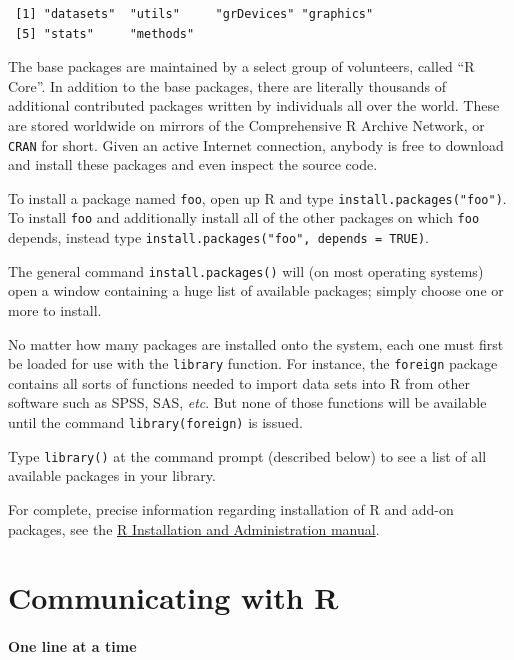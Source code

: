 \documentclass[captions=tableheading]{scrbook}
\begin{document}
\begin{verbatim}
 [1] "datasets"  "utils"     "grDevices" "graphics" 
 [5] "stats"     "methods"
\end{verbatim}

The base packages are maintained by a select group of volunteers, called ``\textsf{R} Core''. In addition to the base packages, there are literally thousands of additional contributed packages written by individuals all over the world. These are stored worldwide on mirrors of the Comprehensive \textsf{R} Archive Network, or \texttt{CRAN} for short. Given an active Internet connection, anybody is free to download and install these packages and even inspect the source code.

To install a package named \texttt{foo}, open up \textsf{R} and type \texttt{install.packages("foo")}. To install \texttt{foo} and additionally install all of the other packages on which \texttt{foo} depends, instead type \texttt{install.packages("foo", depends = TRUE)}.

The general command \texttt{install.packages()} will (on most operating systems) open a window containing a huge list of available packages; simply choose one or more to install.

No matter how many packages are installed onto the system, each one must first be loaded for use with the \texttt{library} function. For instance, the \texttt{foreign} package \cite{foreign} contains all sorts of functions needed to import data sets into \textsf{R} from other software such as SPSS, SAS, \emph{etc}. But none of those functions will be available until the command \texttt{library(foreign)} is issued. 

Type \texttt{library()} at the command prompt (described below) to see a list of all available
packages in your library.

For complete, precise information regarding installation of \textsf{R} and add-on packages, see the \href{http://cran.r-project.org/manuals.html}{\textsf{R} Installation and Administration manual}.
\section{Communicating with \textsf{R}}
\label{sec-2-2}

\label{sec:Communicating-with-R}


\paragraph*{One line at a time}
\end{document}
